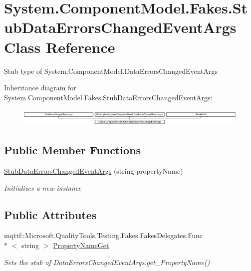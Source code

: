 \hypertarget{class_system_1_1_component_model_1_1_fakes_1_1_stub_data_errors_changed_event_args}{\section{System.\-Component\-Model.\-Fakes.\-Stub\-Data\-Errors\-Changed\-Event\-Args Class Reference}
\label{class_system_1_1_component_model_1_1_fakes_1_1_stub_data_errors_changed_event_args}
}


Stub type of System.\-Component\-Model.\-Data\-Errors\-Changed\-Event\-Args 


Inheritance diagram for System.\-Component\-Model.\-Fakes.\-Stub\-Data\-Errors\-Changed\-Event\-Args\-:\begin{figure}[H]
\begin{center}
\leavevmode
\includegraphics[height=0.872274cm]{class_system_1_1_component_model_1_1_fakes_1_1_stub_data_errors_changed_event_args}
\end{center}
\end{figure}
\subsection*{Public Member Functions}
\begin{DoxyCompactItemize}
\item 
\hyperlink{class_system_1_1_component_model_1_1_fakes_1_1_stub_data_errors_changed_event_args_ab7bd81667d7e5146ff381076fdb94736}{Stub\-Data\-Errors\-Changed\-Event\-Args} (string property\-Name)
\begin{DoxyCompactList}\small\item\em Initializes a new instance\end{DoxyCompactList}\end{DoxyCompactItemize}
\subsection*{Public Attributes}
\begin{DoxyCompactItemize}
\item 
mqttf\-::\-Microsoft.\-Quality\-Tools.\-Testing.\-Fakes.\-Fakes\-Delegates.\-Func\\*
$<$ string $>$ \hyperlink{class_system_1_1_component_model_1_1_fakes_1_1_stub_data_errors_changed_event_args_a7cff7c412c1c8588367399a891395403}{Property\-Name\-Get}
\begin{DoxyCompactList}\small\item\em Sets the stub of Data\-Errors\-Changed\-Event\-Args.\-get\-\_\-\-Property\-Name()\end{DoxyCompactList}\end{DoxyCompactItemize}
